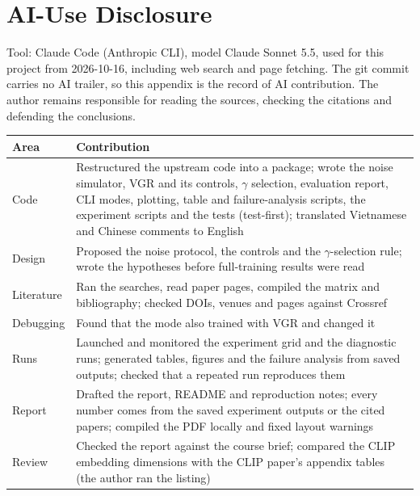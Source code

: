 \documentclass[conference]{IEEEtran}
\newcommand{\code}[1]{\texttt{\detokenize{#1}}}
\begin{document}
\appendices

\section{AI-Use Disclosure}
\label{app:ai}

Tool: Claude Code (Anthropic CLI), model Claude Sonnet 5.5, used for this project from 2026-10-16, including web search and page fetching. The git commit carries no AI trailer, so this appendix is the record of AI contribution. The author remains responsible for reading the sources, checking the citations and defending the conclusions.

\begin{table}[!h]
\centering\footnotesize
\begin{tabularx}{\columnwidth}{@{}p{1.8cm}X@{}}
\toprule
Area & Contribution \\
\midrule
Code & Restructured the upstream code into a package; wrote the noise simulator, VGR and its controls, $\gamma$ selection, evaluation report, CLI modes, plotting, table and failure-analysis scripts, the experiment scripts and the tests (test-first); translated Vietnamese and Chinese comments to English \\
Design & Proposed the noise protocol, the controls and the $\gamma$-selection rule; wrote the hypotheses before full-training results were read \\
Literature & Ran the searches, read paper pages, compiled the matrix and bibliography; checked DOIs, venues and pages against Crossref \\
Debugging & Found that the \code{improved} mode also trained with VGR and changed it \\
Runs & Launched and monitored the experiment grid and the diagnostic runs; generated tables, figures and the failure analysis from saved outputs; checked that a repeated run reproduces them \\
Report & Drafted the report, README and reproduction notes; every number comes from the saved experiment outputs or the cited papers; compiled the PDF locally and fixed layout warnings \\
Review & Checked the report against the course brief; compared the CLIP embedding dimensions with the CLIP paper's appendix tables (the author ran the \code{open_clip} listing) \\
\bottomrule
\end{tabularx}
\end{table}
\end{document}
